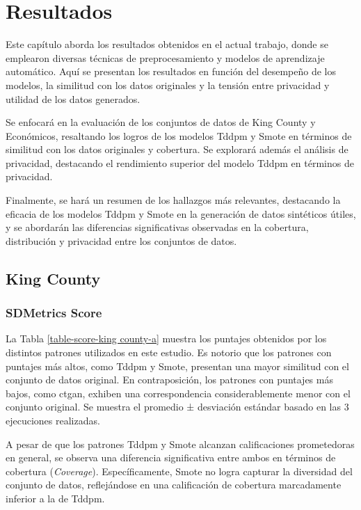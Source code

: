 \chapter{Resultados}
\label{chap:resultados}
Este capítulo aborda los resultados obtenidos en el actual trabajo, donde se emplearon diversas técnicas de preprocesamiento y modelos de aprendizaje automático. Aquí se presentan los resultados en función del desempeño de los modelos, la similitud con los datos originales y la tensión entre privacidad y utilidad de los datos generados.

Se enfocará en la evaluación de los conjuntos de datos de King County y Económicos, resaltando los logros de los modelos Tddpm y Smote en términos de similitud con los datos originales y cobertura. Se explorará además el análisis de privacidad, destacando el rendimiento superior del modelo Tddpm en términos de privacidad.

Finalmente, se hará un resumen de los hallazgos más relevantes, destacando la eficacia de los modelos Tddpm y Smote en la generación de datos sintéticos útiles, y se abordarán las diferencias significativas observadas en la cobertura, distribución y privacidad entre los conjuntos de datos.

\newpage
\section{King County}
\subsection{SDMetrics Score}
La Tabla \ref{table-score-king county-a} muestra los puntajes obtenidos por los distintos patrones utilizados en este estudio. Es notorio que los patrones con puntajes más altos, como Tddpm y Smote, presentan una mayor similitud con el conjunto de datos original. En contraposición, los patrones con puntajes más bajos, como ctgan, exhiben una correspondencia considerablemente menor con el conjunto original. Se muestra el promedio ± desviación estándar basado en las 3 ejecuciones realizadas.

    
A pesar de que los patrones Tddpm y Smote alcanzan calificaciones prometedoras en general, se observa una diferencia significativa entre ambos en términos de cobertura (\emph{Coverage}). Específicamente, Smote no logra capturar la diversidad del conjunto de datos, reflejándose en una calificación de cobertura marcadamente inferior a la de Tddpm.

